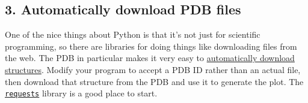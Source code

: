 \documentclass{article}
\newcommand{\module}[2]{\href{#2}{\texttt{#1}}}
\begin{document}
\subsection{3. Automatically download PDB files}

One of the nice things about Python is that it's not just for scientific 
programming, so there are libraries for doing things like downloading files 
from the web.  The PDB in particular makes it very easy to 
\href{http://www.rcsb.org/pdb/software/rest.do#search}{automatically download 
structures}.  Modify your program to accept a PDB ID rather than an actual 
file, then download that structure from the PDB and use it to generate the 
plot.  The \module{requests}{http://docs.python-requests.org} library is a good 
place to start.
\end{document}
